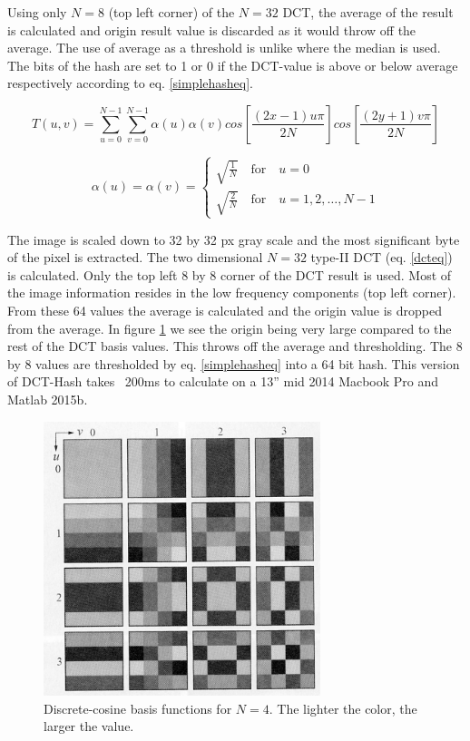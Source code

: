 \documentclass[english,12pt,a4paper,pdftex,elec,utf8, table]{aaltothesis}
\begin{document}
Using only $N = 8$ (top left corner) of the $N=32$ DCT, the average of the result is calculated and origin result value is discarded as it would throw off the average. The use of average as a threshold is unlike \cite{Coskun2004} where the median is used. The bits of the hash are set to 1 or 0 if the DCT-value is above or below average respectively according to eq. \ref{simplehasheq}.

\begin{equation}\label{dcteq}
T(u,v)= \sum_{u=0}^{N-1} \sum_{v=0}^{N-1}\alpha(u)\alpha(v)cos\left[\frac{(2x-1)u\pi}{2N}\right]cos\left[\frac{(2y + 1)v\pi}{2N}\right]
\end{equation}

\begin{equation}\label{dctcoefeq}
  \alpha(u) = \alpha(v)= \begin{cases}
    \sqrt{\frac{1}{N}} \quad \textrm{for} \quad u=0\\
    \sqrt{\frac{2}{N}} \quad \textrm{for} \quad u=1,2,\ldots,N-1
    \end{cases}
\end{equation}

The image is scaled down to 32 by 32 px gray scale and the most significant byte of the pixel is extracted. The two dimensional $N=32$ type-II DCT (eq. \ref{dcteq}) is calculated. Only the top left 8 by 8 corner of the DCT result is used. Most of the image information resides in the low frequency components (top left corner). From these 64 values the average is calculated and the origin value is dropped from the average. In figure \ref{dctkernels} we see the origin being very large compared to the rest of the DCT basis values. This throws off the average and thresholding. The 8 by 8 values are thresholded by eq. \ref{simplehasheq} into a 64 bit hash. This version of DCT-Hash takes ~200ms to calculate on a 13'' mid 2014 Macbook Pro and Matlab 2015b.

\begin{figure}[htb]
\begin{center}
\includegraphics[height=8cm]{figures/dct}
\end{center}
\caption{Discrete-cosine basis functions for $N = 4$. The lighter the color, the larger the value. \cite[p. 473]{Gonzalez2002}}
\label{dctkernels}
\end{figure}
\end{document}
